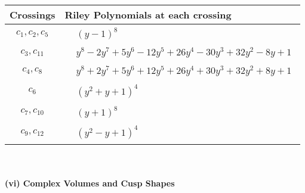 \documentclass[1p]{elsarticle_modified}
\theoremstyle{definition}
\begin{document}
\begin{tabular}{m{50pt}|m{274pt}}
Crossings & \hspace{64pt}Riley Polynomials at each crossing \\
\hline $$\begin{aligned}c_{1},c_{2},c_{5}\end{aligned}$$&$\begin{aligned}
&(y-1)^8
\end{aligned}$\\
\hline $$\begin{aligned}c_{3},c_{11}\end{aligned}$$&$\begin{aligned}
&y^8-2 y^7+5 y^6-12 y^5+26 y^4-30 y^3+32 y^2-8 y+1
\end{aligned}$\\
\hline $$\begin{aligned}c_{4},c_{8}\end{aligned}$$&$\begin{aligned}
&y^8+2 y^7+5 y^6+12 y^5+26 y^4+30 y^3+32 y^2+8 y+1
\end{aligned}$\\
\hline $$\begin{aligned}c_{6}\end{aligned}$$&$\begin{aligned}
&(y^2+y+1)^4
\end{aligned}$\\
\hline $$\begin{aligned}c_{7},c_{10}\end{aligned}$$&$\begin{aligned}
&(y+1)^8
\end{aligned}$\\
\hline $$\begin{aligned}c_{9},c_{12}\end{aligned}$$&$\begin{aligned}
&(y^2- y+1)^4
\end{aligned}$\\
\hline
\end{tabular}\\~\\
\newpage\flushleft \textbf{(vi) Complex Volumes and Cusp Shapes}
\end{document}
